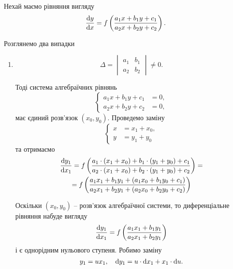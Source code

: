Нехай маємо рівняння вигляду
\begin{equation*}
	\label{eq:linear-fractional-equation}
	\frac{\mathop{}\!\mathrm{d} y}{\mathop{}\!\mathrm{d} x} = f \left( \frac{a_1 x + b_1 y + c_1}{a_2 x + b_2 y + c_2} \right).
\end{equation*}

Розглянемо два випадки
\begin{enumerate}
	\item 
	\begin{equation*}
		\Delta = \begin{vmatrix} a_1 & b_1 \\ a_2 & b_2 \end{vmatrix} \ne 0.
	\end{equation*}

	Тоді система алгебраїчних рівнянь
	\begin{equation*}
		\left\{
			\begin{aligned}
				a_1 x + b_1 y + c_1 &= 0, \\
				a_2 x + b_2 y + c_2 &= 0,
			\end{aligned}
		\right.
	\end{equation*}
	має єдиний розв’язок $(x_0, y_0)$. Проведемо заміну 
	\begin{equation*}
		\left\{\begin{aligned}
			x &= x_1 + x_0, \\
			y &= y_1 + y_0
		\end{aligned}\right.
	\end{equation*}
	та отримаємо
	\begin{multline*}
		\frac{\mathop{}\!\mathrm{d} y_1}{\mathop{}\!\mathrm{d} x_1} = f \left( \frac{a_1 \cdot (x_1 + x_0) + b_1 \cdot (y_1 + y_0) + c_1}{a_2 \cdot (x_1 + x_0) + b_2 \cdot (y_1 + y_0) + c_2} \right) = \\
		= f \left( \frac{a_1 x_1 + b_1 y_1 + (a_1 x_0 + b_1 y_0 + c_1)}{a_2 x_1 + b_2 y_1 + (a_2 x_0 + b_2 y_0 + c_2)} \right)
	\end{multline*}

	Оскільки $(x_0, y_0)$ -- розв’язок алгебраїчної системи, то диференціальне рівняння набуде вигляду
	\begin{equation*}
		\frac{\mathop{}\!\mathrm{d} y_1}{\mathop{}\!\mathrm{d} x_1} = f \left( \frac{a_1 x_1 + b_1 y_1}{a_2 x_1 + b_2 y_1} \right)
	\end{equation*}
	і є однорідним нульового ступеня. Робимо заміну 
	\begin{equation*}
		y_1 = u x_1, \quad \mathop{}\!\mathrm{d} y_1 = u \cdot \mathop{}\!\mathrm{d} x_1 + x_1 \cdot \mathop{}\!\mathrm{d} u.
	\end{equation*}


\end{enumerate}
